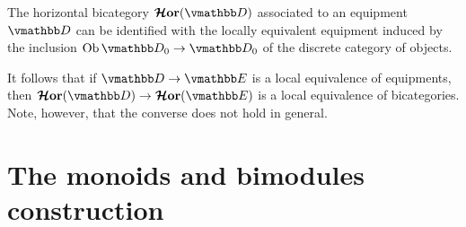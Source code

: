 \documentclass[12pt,oneside,article,draft]{memoir}
\begin{document}
\begin{example}\label{ex:horizontal_bicategory}
   The horizontal bicategory $\HHor(\dcat{D})$ associated to an equipment $\dcat{D}$ can be
   identified with the locally equivalent equipment induced by the inclusion
   $\Ob\dcat{D}_0\to\dcat{D}_0$ of the discrete category of objects. 

   It follows that if $\dcat{D}\to\dcat{E}$ is a local equivalence of equipments, then
   $\HHor(\dcat{D})\to\HHor(\dcat{E})$ is a local equivalence of bicategories. Note, however, that
   the converse does not hold in general.
\end{example}




\section{The monoids and bimodules construction}
\end{document}
